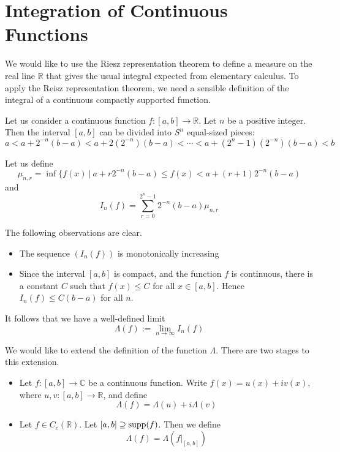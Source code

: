 


\section{Integration of Continuous Functions}

We would like to use the Riesz representation theorem to define a measure on the real line $\mathbb R$ that gives the usual integral expected from elementary calculus.  To apply the Reisz representation theorem, we need a sensible definition of the integral of a continuous compactly supported function.

Let us consider a continuous function $f\colon [a,b]\rightarrow {\mathbb R}$.  Let $n$ be a positive integer.  Then the interval $[a,b]$ can be divided into $S^n$ equal-sized pieces:
$$a< a+ 2^{-n}(b-a) < a+ 2(2^{-n})(b-a) < \cdots < a+ (2^n -1)(2^{-n})(b-a) < b$$

Let us define
$$\mu_{n,r}  = \inf \{ f(x) \ |\ a+r2^{-n}(b-a) \leq f(x) < a+ (r+1)2^{-n}(b-a)$$
and
$$I_n (f) = \sum_{r=0}^{2^n -1} 2^{-n}(b-a) \mu_{n,r}$$

The following observations are clear.

\begin{itemize}

\item The sequence $(I_n (f))$ is monotonically increasing

\item Since the interval $[a,b]$ is compact, and the function $f$ is continuous, there is a constant $C$ such that $f(x)\leq C$ for all $x\in [a,b]$.  Hence $I_n (f) \leq C(b-a)$ for all $n$.

\end{itemize}

It follows that we have a well-defined limit
$$\Lambda (f) := \lim_{n\rightarrow \infty} I_n (f)$$

We would like to extend the definition of the function $\Lambda$.  There are two stages to this extension.

\begin{itemize}

\item Let $f\colon [a,b]\rightarrow {\mathbb C}$ be a continuous function.  Write $f(x) = u(x) + iv(x)$, where $u,v\colon [a,b]\rightarrow {\mathbb R}$, and define
$$\Lambda (f) = \Lambda (u) + i \Lambda (v)$$

\item Let $f\in C_c ({\mathbb R})$.  Let $[a,b]\supseteq \operatorname{supp} (f)$.  Then we define 
$$\Lambda (f) = \Lambda (f|_{[a,b]})$$

\end{itemize}

